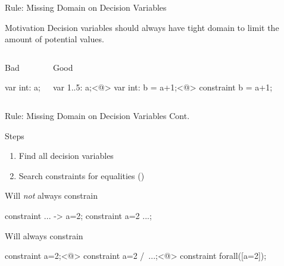 \documentclass[aspectratio=169]{beamer} %
\begin{document}
\begin{frame}[fragile]{Rule: Missing Domain on Decision Variables}
  \begin{block}{Motivation}
    Decision variables should \alert{always} have tight domain to limit the amount of potential values.
  \end{block}

  \pause
  \begin{columns}[t,onlytextwidth]
  \begin{exampleblock}{Bad}
    \begin{mznno}
var int: a;
    \end{mznno}
  \end{exampleblock}

  \begin{exampleblock}{Good}
    \begin{mznno}
var 1..5: a;<@\pause@>
var int: b = a+1;<@\pause@>
constraint b = a+1;
    \end{mznno}
  \end{exampleblock}
  \end{columns}
\end{frame}

\begin{frame}[fragile]{Rule: Missing Domain on Decision Variables Cont.}
  \begin{block}{Steps}
    \begin{enumerate}
      \item Find all decision variables
      \item Search constraints for equalities ()
    \end{enumerate}
  \end{block}

  \pause
  \begin{alertblock}{Will \emph{not} always constrain }
    \begin{mznno}
constraint ... -> a=2;
constraint a=2 \/ ...;
    \end{mznno}
  \end{alertblock}

  \pause
  \begin{block}{Will always constrain }
    \begin{mznno}
constraint a=2;<@\pause@>
constraint a=2 /\ ...;<@\pause@>
constraint forall([a=2]);
    \end{mznno}
  \end{block}
\end{frame}
\end{document}
